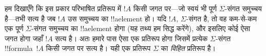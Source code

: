 \documentclass[../../../include/open-logic-section]{subfiles}
\begin{document}
हम दिखाएँगे कि इस प्रकार परिभाषित प्रतिरूप में $!A$ किसी जगत पर---जो स्वयं
भी पूर्ण $\Sigma$-संगत समुच्चय है---तभी सत्य है जब $!A$ उस समुच्चय का
!!a{element} हो। यदि $!A$, $\Sigma$-संगत है, तो वह कम-से-कम एक पूर्ण
$\Sigma$-संगत समुच्चय का !!a{element} होगा (यह तथ्य हम सिद्ध करेंगे), और
इसलिए कोई ऐसा जगत होगा जहाँ $!A$ सत्य है। अतः हमारे पास ऐसा एक प्रतिरूप
होगा जिसमें प्रत्येक $\Sigma$-संगत !!{formula}~$!A$ किसी जगत पर सत्य है।
यही एक प्रतिरूप $\Sigma$ का \emph{विहित} प्रतिरूप है।
\end{document}
